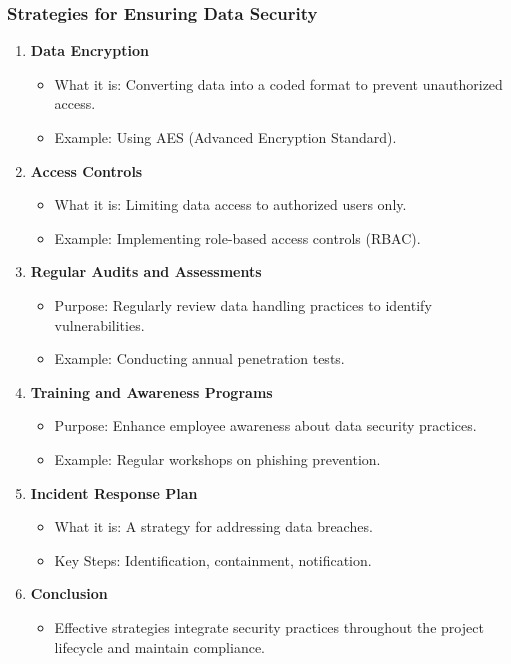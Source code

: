 \documentclass{beamer}
\begin{document}
\begin{frame}[fragile]
    \frametitle{Strategies for Ensuring Data Security}
    \begin{enumerate}
        \item \textbf{Data Encryption}
        \begin{itemize}
            \item What it is: Converting data into a coded format to prevent unauthorized access.
            \item Example: Using AES (Advanced Encryption Standard).
        \end{itemize}

        \item \textbf{Access Controls}
        \begin{itemize}
            \item What it is: Limiting data access to authorized users only.
            \item Example: Implementing role-based access controls (RBAC).
        \end{itemize}

        \item \textbf{Regular Audits and Assessments}
        \begin{itemize}
            \item Purpose: Regularly review data handling practices to identify vulnerabilities.
            \item Example: Conducting annual penetration tests.
        \end{itemize}

        \item \textbf{Training and Awareness Programs}
        \begin{itemize}
            \item Purpose: Enhance employee awareness about data security practices.
            \item Example: Regular workshops on phishing prevention.
        \end{itemize}

        \item \textbf{Incident Response Plan}
        \begin{itemize}
            \item What it is: A strategy for addressing data breaches.
            \item Key Steps: Identification, containment, notification.
        \end{itemize}
        
        \item \textbf{Conclusion}
        \begin{itemize}
            \item Effective strategies integrate security practices throughout the project lifecycle and maintain compliance.
        \end{itemize}
    \end{enumerate}
\end{frame}
\end{document}
